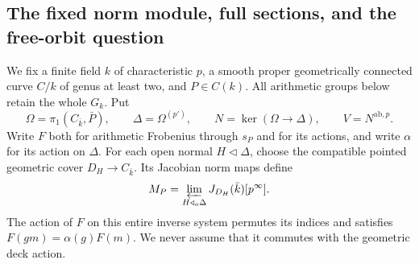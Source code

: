 \subsection{The fixed norm module, full sections, and the free-orbit question}

We fix a finite field $k$ of characteristic $p$, a smooth proper
geometrically connected curve $C/k$ of genus at least two, and
$P\in C(k)$. All arithmetic groups below retain the whole $G_k$.
Put
\[
 \Omega=\pi_1(C_{\bar k},\bar P),\qquad
 \Delta=\Omega^{(p')},\qquad
 N=\ker(\Omega\longrightarrow\Delta),\qquad
 V=N^{\mathrm{ab},p}.
\]
Write $F$ both for arithmetic Frobenius through $s_P$ and for its
actions, and write $\alpha$ for its action on $\Delta$. For each
open normal $H\triangleleft\Delta$, choose the compatible pointed
geometric cover $D_H\to C_{\bar k}$. Its Jacobian norm maps define
\[
 M_P=\varprojlim_{H\triangleleft_o\Delta}
                 J_{D_H}(\bar k)[p^\infty].
\]
The action of $F$ on this entire inverse system permutes its
indices and satisfies $F(gm)=\alpha(g)F(m)$. We never assume that
it commutes with the geometric deck action.

